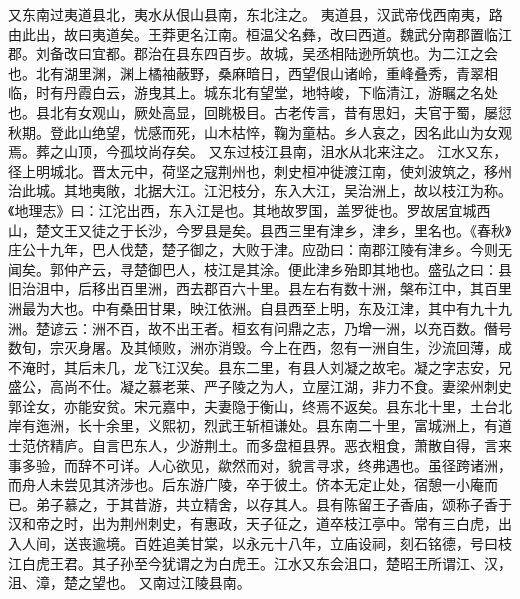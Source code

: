 \documentclass[12pt,UTF8]{ctexbook}
\begin{document}
又东南过夷道县北，夷水从佷山县南，东北注之。
夷道县，汉武帝伐西南夷，路由此出，故曰夷道矣。王莽更名江南。桓温父名彝，改曰西道。魏武分南郡置临江郡。刘备改曰宜都。郡治在县东四百步。故城，吴丞相陆逊所筑也。为二江之会也。北有湖里渊，渊上橘袖蔽野，桑麻暗日，西望佷山诸岭，重峰叠秀，青翠相临，时有丹霞白云，游曳其上。城东北有望堂，地特峻，下临清江，游瞩之名处也。县北有女观山，厥处高显，回眺极目。古老传言，昔有思妇，夫官于蜀，屡愆秋期。登此山绝望，忧感而死，山木枯悴，鞠为童枯。乡人哀之，因名此山为女观焉。葬之山顶，今孤坟尚存矣。
又东过枝江县南，沮水从北来注之。
江水又东，径上明城北。晋太元中，荷坚之寇荆州也，刺史桓冲徙渡江南，使刘波筑之，移州治此城。其地夷敞，北据大江。江汜枝分，东入大江，吴治洲上，故以枝江为称。《地理志》曰：江沱出西，东入江是也。其地故罗国，盖罗徙也。罗故居宜城西山，楚文王又徒之于长沙，今罗县是矣。县西三里有津乡，津乡，里名也。《春秋》庄公十九年，巴人伐楚，楚子御之，大败于津。应劭曰：南郡江陵有津乡。今则无闻矣。郭仲产云，寻楚御巴人，枝江是其涂。便此津乡殆即其地也。盛弘之曰：县旧治沮中，后移出百里洲，西去郡百六十里。县左右有数十洲，槃布江中，其百里洲最为大也。中有桑田甘果，映江依洲。自县西至上明，东及江津，其中有九十九洲。楚谚云：洲不百，故不出王者。桓玄有问鼎之志，乃增一洲，以充百数。僭号数旬，宗灭身屠。及其倾败，洲亦消毁。今上在西，忽有一洲自生，沙流回薄，成不淹时，其后未几，龙飞江汉矣。县东二里，有县人刘凝之故宅。凝之字志安，兄盛公，高尚不仕。凝之慕老莱、严子陵之为人，立屋江湖，非力不食。妻梁州刺史郭诠女，亦能安贫。宋元嘉中，夫妻隐于衡山，终焉不返矣。县东北十里，土台北岸有迤洲，长十余里，义熙初，烈武王斩桓谦处。县东南二十里，富城洲上，有道士范侪精庐。自言巴东人，少游荆土。而多盘桓县界。恶衣粗食，萧散自得，言来事多验，而辞不可详。人心欲见，歘然而对，貌言寻求，终弗遇也。虽径跨诸洲，而舟人未尝见其济涉也。后东游广陵，卒于彼土。侪本无定止处，宿憩一小庵而已。弟子慕之，于其昔游，共立精舍，以存其人。县有陈留王子香庙，颂称子香于汉和帝之时，出为荆州刺史，有惠政，天子征之，道卒枝江亭中。常有三白虎，出入人间，送丧逾境。百姓追美甘棠，以永元十八年，立庙设祠，刻石铭德，号曰枝江白虎王君。其子孙至今犹谓之为白虎王。江水又东会沮口，楚昭王所谓江、汉，沮、漳，楚之望也。
又南过江陵县南。
\end{document}

